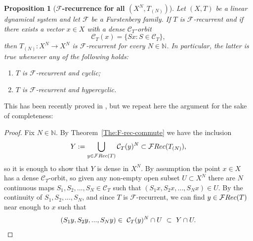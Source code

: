 \documentclass[openright,11pt]{article}
\theoremstyle{plain}
\newtheorem{proposition}[theorem]{Proposition}
\theoremstyle{definition}
\newcommand{\NN}{\mathbb{N}}
\newcommand{\Fc}{\mathcal{F}}
\newcommand{\Rec}{\textup{Rec}}
\newcommand{\Com}{\mathcal{C}}
\newcommand{\cl}{\overline}
\begin{document}
\begin{proposition}[\textbf{$\Fc$-recurrence for all $(X^N,T_{(N)})$}]\label{Pro:prod-F-recurrence}
	Let $(X,T)$ be a linear dynamical system and let $\Fc$ be a Furstenberg family. If $T$ is $\Fc$-recurrent and if there exists a vector $x \in X$ with a dense $\Com_T$-orbit
	\[
	\Com_T(x) = \{Sx : S \in \Com_T \},
	\]%
	then $T_{(N)}:X^N\longrightarrow X^N$ is $\Fc$-recurrent for every $N \in \NN$. In particular, the latter is true whenever any of the following holds:
	\begin{enumerate}[--]
		\item $T$ is $\Fc$-recurrent and cyclic;
		
		\item $T$ is $\Fc$-recurrent and hypercyclic.
	\end{enumerate}
\end{proposition}
This has been recently proved in \cite[Proposition~3.8]{CarMur2022_arXiv}, but we repeat here the argument for the sake of completeness:
\begin{proof}
	Fix $N \in \NN$. By Theorem~\ref{The:F-rec-commute} we have the inclusion
	\[
	Y := \bigcup_{y \in \Fc\Rec(T)} \Com_T(y)^N \subset \Fc\Rec(T_{(N)}),
	\]
	so it is enough to show that $Y$ is dense in $X^N$. By assumption the point $x \in X$ has a dense $\Com_T$-orbit, so given any non-empty open subset $U \subset X^N$ there are $N$ continuous maps $S_1,S_2,...,S_N \in \Com_T$ such that $(S_1x,S_2x,...,S_Nx) \in U$. By the continuity of $S_1,S_2,...,S_N$, and since $T$ is $\Fc$-recurrent, we can find $y \in \Fc\Rec(T)$ near enough to $x$ such that
	\[
	(S_1y,S_2y,...,S_Ny) \in \ \Com_T(y)^N \cap U \ \subset \ Y \cap U.\qedhere
	\]
\end{proof}
\end{document}
